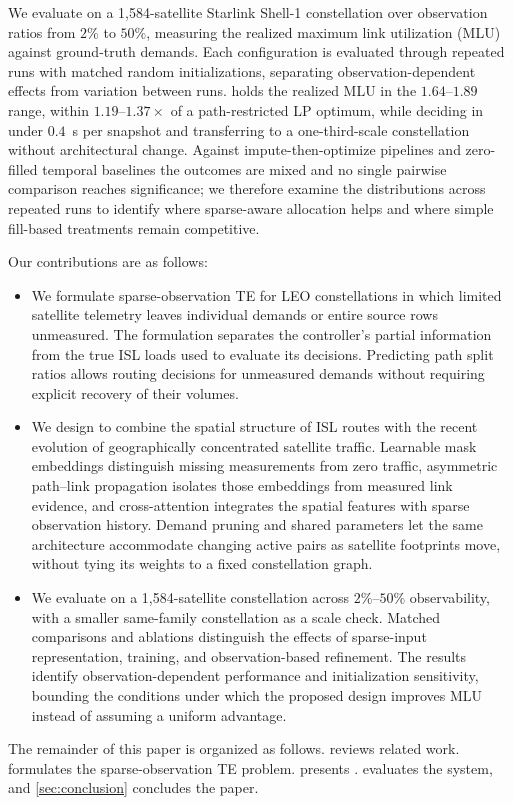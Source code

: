 We evaluate \sysname{} on a 1{,}584-satellite Starlink Shell-1
constellation over observation ratios from $2\%$ to $50\%$, measuring the
realized maximum link utilization (MLU) against ground-truth demands. Each
configuration is evaluated through repeated runs with matched random
initializations, separating observation-dependent effects from variation
between runs. \sysname{} holds the
realized MLU in the $1.64$--$1.89$ range, within $1.19$--$1.37\times$ of a
path-restricted LP optimum, while deciding in under $0.4$~s per snapshot and
transferring to a one-third-scale constellation without architectural change.
Against impute-then-optimize pipelines and zero-filled temporal baselines the
outcomes are mixed and no single pairwise comparison reaches significance; we
therefore examine the distributions across repeated runs to identify where
sparse-aware allocation helps and where simple fill-based treatments remain
competitive.

Our contributions are as follows:
\begin{itemize}
    \item We formulate sparse-observation TE for LEO constellations in which
    limited satellite telemetry leaves individual demands or entire source
    rows unmeasured. The formulation separates the controller's partial
    information from the true ISL loads used to evaluate its decisions.
    Predicting path split ratios allows routing decisions for unmeasured
    demands without requiring explicit recovery of their volumes.
    \item We design \sysname{} to combine the spatial structure of ISL routes
    with the recent evolution of geographically concentrated satellite traffic.
    Learnable mask embeddings distinguish missing measurements from zero
    traffic, asymmetric path--link propagation isolates those embeddings from
    measured link evidence, and cross-attention integrates the spatial features
    with sparse observation history. Demand pruning and shared parameters let
    the same architecture accommodate changing active pairs as satellite
    footprints move, without tying its weights to a fixed constellation graph.
    \item We evaluate \sysname{} on a 1{,}584-satellite constellation across
    $2\%$--$50\%$ observability, with a smaller same-family constellation as a
    scale check. Matched comparisons and ablations distinguish the effects of
    sparse-input representation, training, and observation-based refinement.
    The results identify observation-dependent performance and initialization
    sensitivity, bounding the conditions under which the proposed design
    improves MLU instead of assuming a uniform advantage.
\end{itemize}

The remainder of this paper is organized as follows.
 reviews related work.  formulates
the sparse-observation TE problem.  presents \sysname{}.
 evaluates the system, and \cref{sec:conclusion} concludes
the paper.
